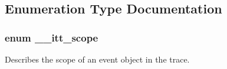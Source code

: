 \subsection{Enumeration Type Documentation}
\hypertarget{group__markers_ga9712c6a992a435d4d134e7164f609f04}{
\subsubsection[{\-\_\-\-\_\-itt\-\_\-scope}]{\setlength{\rightskip}{0pt plus 5cm}enum {\bf \-\_\-\-\_\-itt\-\_\-scope}}}\label{group__markers_ga9712c6a992a435d4d134e7164f609f04}


Describes the scope of an event object in the trace. 

